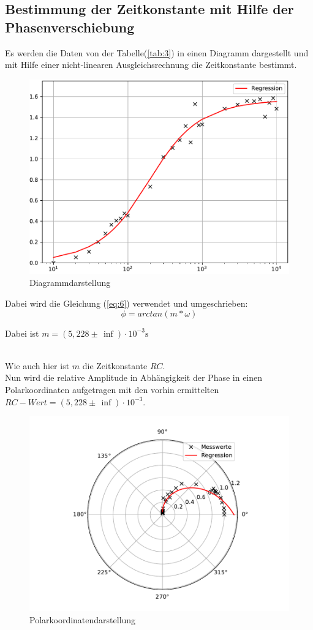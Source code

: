 \subsection{Bestimmung der Zeitkonstante mit Hilfe der Phasenverschiebung}
Es werden die Daten von der Tabelle(\ref{tab:3}) in einen Diagramm dargestellt und mit Hilfe
einer nicht-linearen Ausgleichsrechnung die Zeitkonstante bestimmt.

\begin{figure}[H]
  \centering
  \includegraphics[width=\textwidth]{Diagramm3.pdf}
  \caption{Diagrammdarstellung}
  \label{fig:8}
\end{figure}
Dabei wird die Gleichung (\ref{eq:6}) verwendet und umgeschrieben:
\begin{equation*}
  \phi= arctan(m*\omega)
\end{equation*}
\centerline{Dabei ist $m=(5,228 \pm \, \inf) \cdot 10^{-3} \si{\second}$} \\
Wie auch hier ist $m$ die Zeitkonstante $RC$.\\
Nun wird die relative Amplitude in Abhängigkeit der Phase in einen Polarkoordinaten aufgetragen mit
den vorhin ermittelten $RC-Wert = (5,228 \pm \, \inf) \cdot 10^{-3}$.
\begin{figure}[H]
  \centering
  \includegraphics[width=\textwidth]{Polar.pdf}
  \caption{Polarkoordinatendarstellung}
  \label{fig:9}
\end{figure}
